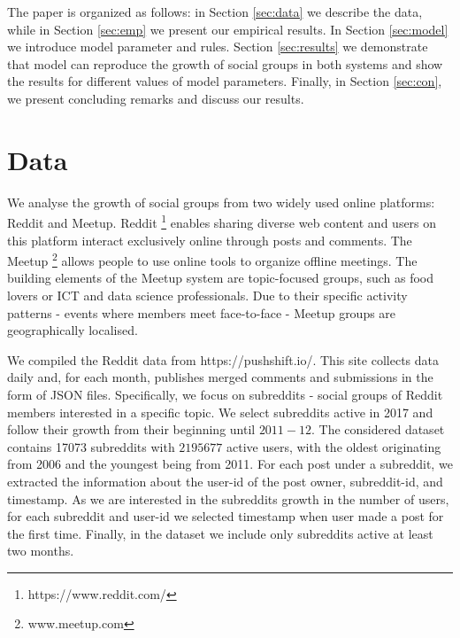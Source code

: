 The paper is organized as follows: in Section \ref{sec:data} we describe the data, while in Section \ref{sec:emp} we present our empirical results. In Section \ref{sec:model} we introduce model parameter and rules. Section \ref{sec:results} we demonstrate that model can reproduce the growth of social groups in both systems and show the results for different values of model parameters. Finally, in Section \ref{sec:con}, we present concluding remarks and discuss our results. 

\section{Data \label{sec:data}}
We analyse the growth of social groups from two widely used online platforms: Reddit and Meetup. Reddit \footnote{https://www.reddit.com/} enables sharing diverse web content and users on this platform interact exclusively online through posts and comments. The Meetup \footnote{www.meetup.com} allows people to use online tools to organize offline meetings. The building elements of the Meetup system are topic-focused groups, such as food lovers or ICT and data science professionals. Due to their specific activity patterns - events where members meet face-to-face - Meetup groups are geographically localised. 



We compiled the Reddit data from https://pushshift.io/. This site collects data daily and, for each month, publishes merged comments and submissions in the form of JSON files. 
Specifically, we focus on subreddits - social groups of Reddit members interested in a specific topic. 
We select subreddits active in 2017 and follow their growth from their beginning until $2011-12$. The considered dataset contains 17073 subreddits with $2 195 677$ active users, with the oldest originating from 2006 and the youngest being from 2011. For each post under a subreddit, we extracted the information about the user-id of the post owner, subreddit-id, and timestamp. As we are interested in the subreddits growth in the number of users, for each subreddit and user-id we selected timestamp when user made a post for the first time. Finally, in the dataset we include only subreddits active at least two months.  

